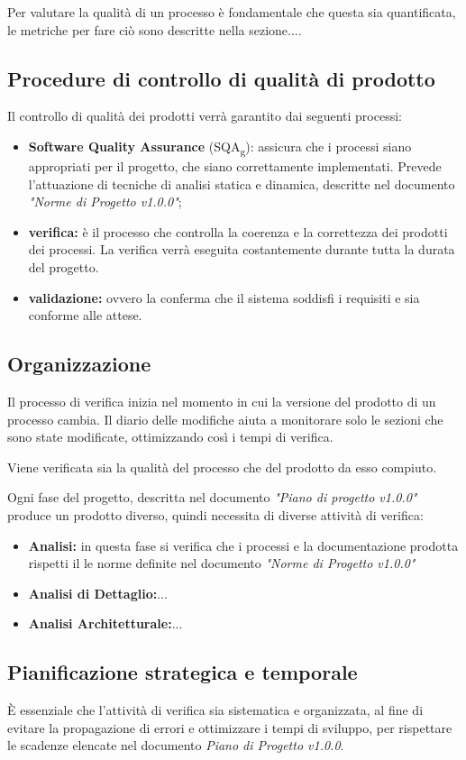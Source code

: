 \documentclass[12pt,a4paper,titlepage]{article}
\begin{document}
	Per valutare la qualità di un processo è fondamentale che questa sia quantificata, le metriche per fare ciò sono descritte nella sezione....
	
	\subsection{Procedure di controllo di qualità di prodotto}
	Il controllo di qualità dei prodotti verrà garantito dai seguenti processi:
	\begin{itemize}
		\item \textbf{Software Quality Assurance} (SQA\textsubscript{g}): assicura che i processi siano appropriati per il progetto, che siano correttamente implementati. Prevede l'attuazione di tecniche di analisi statica e dinamica, descritte nel documento \textit{"Norme di Progetto v1.0.0"};
		\item \textbf{verifica:} è il processo che controlla la coerenza e la correttezza dei prodotti dei processi. La verifica verrà eseguita costantemente durante tutta la durata del progetto.
		\item \textbf{validazione:} ovvero la conferma che il sistema soddisfi i requisiti e sia conforme alle attese.
	\end{itemize}

	\subsection{Organizzazione}
	Il processo di verifica inizia nel momento in cui la versione del prodotto di un processo cambia. Il diario delle modifiche aiuta a monitorare solo le sezioni che sono state modificate, ottimizzando così i tempi di verifica. 
	
	Viene verificata sia la qualità del processo che del prodotto da esso compiuto.
	
	Ogni fase del progetto, descritta nel documento \textit{"Piano di progetto v1.0.0"} produce un prodotto diverso, quindi necessita di diverse attività di verifica:
	\begin{itemize}
		\item \textbf{Analisi:} in questa fase si verifica che i processi e la documentazione prodotta rispetti il le norme definite nel documento \textit{"Norme di Progetto v1.0.0"}
		\item \textbf{Analisi di Dettaglio:}...
		\item \textbf{Analisi Architetturale:}...
	\end{itemize}
	\subsection{Pianificazione strategica e temporale}
	È essenziale che l'attività di verifica sia sistematica e organizzata, al fine di evitare la propagazione di errori e ottimizzare i tempi di sviluppo, per rispettare le scadenze elencate nel documento \textit{Piano di Progetto v1.0.0}.
	
\end{document}
